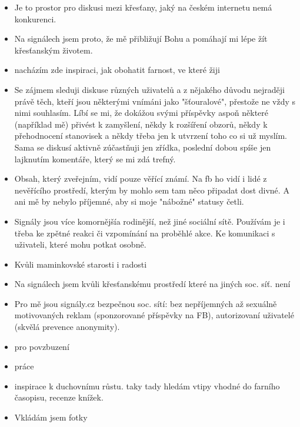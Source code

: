 \documentclass[12pt, a4paper, twoside]{article}
\begin{document}
\begin{itemize}
\item Je to prostor pro diskusi mezi křesťany, jaký na českém internetu nemá konkurenci.

\item Na signálech jsem proto, že mě přibližují Bohu a pomáhají mi lépe žít křesťanským životem.

\item nacházím zde inspiraci, jak obohatit farnost, ve které žiji

\item Se zájmem sleduji diskuse různých uživatelů a z nějakého důvodu nejraději právě těch, kteří jsou některými vnímáni jako "šťouralové", přestože ne vždy s nimi souhlasím. Líbí se mi, že dokážou svými příspěvky aspoň některé (například mě) přivést k zamyšlení, někdy k rozšíření obzorů, někdy k přehodnocení stanovisek a někdy třeba jen k utvrzení toho co si už myslím. Sama se diskusí aktivně zúčastňuji jen zřídka, poslední dobou spíše jen lajknutím komentáře, který se mi zdá trefný.

\item Obsah, který zveřejním, vidí pouze věřící známí. Na fb ho vidí i lidé z nevěřícího prostředí, kterým by mohlo sem tam něco připadat dost divné. A ani mě by nebylo příjemné, aby si moje "nábožné" statusy četli.

\item Signály jsou více komornějšía  rodinější, než jiné sociální sítě. Používám je i třeba ke zpětné reakci či vzpomínání na proběhlé akce. Ke komunikaci s uživateli, které mohu potkat osobně.

\item Kvůli maminkovské starosti i radosti

\item Na signálech jsem kvůli křesťanskému prostředí které na jiných soc. síť. není

\item Pro mě jsou signály.cz bezpečnou soc. sítí: bez nepříjemných až sexuálně motivovaných reklam (sponzorované příspěvky na FB), autorizovaní uživatelé (skvělá prevence anonymity).

\item pro povzbuzení

\item práce

\item inspirace k duchovnímu růstu. taky tady hledám vtipy vhodné do farního časopisu, recenze knížek.

\item Vkládám jsem fotky


\end{itemize}
\end{document}
